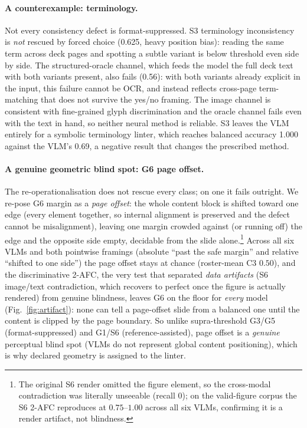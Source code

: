 \documentclass[10pt]{article}
\newcommand{\g}[1]{\textsf{#1}}        %
\begin{document}
\paragraph{A counterexample: terminology.}
Not every consistency defect is format-suppressed. \g{S3} terminology inconsistency is \emph{not} rescued by
forced choice (0.625, heavy position bias): reading the same term across deck pages and spotting a subtle
variant is below threshold even side by side. The structured-oracle channel, which feeds the model
the full deck text with both variants present, also fails (0.56): with both variants already explicit in the
input, this failure cannot be OCR, and instead reflects cross-page term-matching that does not survive the
yes/no framing. The image channel is consistent with fine-grained glyph discrimination and the oracle channel
fails even with the text in hand, so neither neural method is reliable. \g{S3} leaves the VLM entirely for a symbolic terminology linter,
which reaches balanced accuracy 1.000 against the VLM's 0.69, a negative result that changes the prescribed method.

\paragraph{A genuine geometric blind spot: \g{G6} page offset.}
The re-operationalisation does not rescue every class; on one it fails outright. We re-pose \g{G6} margin as
a \emph{page offset}: the whole content block is shifted toward one edge (every element together, so internal
alignment is preserved and the defect cannot be misalignment), leaving one margin crowded against (or running
off) the edge and the opposite side empty, decidable from the slide alone.\footnote{The original \g{S6} render
omitted the figure element, so the cross-modal contradiction was literally unseeable (recall $0$); on the
valid-figure corpus the \g{S6} 2-AFC reproduces at $0.75$--$1.00$ across all six VLMs, confirming it is a
render artifact, not blindness.} Across all six VLMs and both pointwise framings (absolute ``past the safe
margin'' and relative ``shifted to one side'') the page offset stays at chance (roster-mean C3 $0.50$), and the
discriminative 2-AFC, the very test that separated \emph{data artifacts} (\g{S6} image/text contradiction,
which recovers to perfect once the figure is actually rendered) from genuine blindness, leaves \g{G6} on the
floor for \emph{every} model (Fig.~\ref{fig:artifact}): none can tell a page-offset slide from a balanced one
until the content is clipped by the page boundary. So unlike supra-threshold \g{G3}/\g{G5}
(format-suppressed) and \g{G1}/\g{S6} (reference-assisted), page offset is a \emph{genuine} perceptual blind spot (VLMs do not
represent global content positioning), which is why declared geometry is assigned to the linter.
\end{document}
